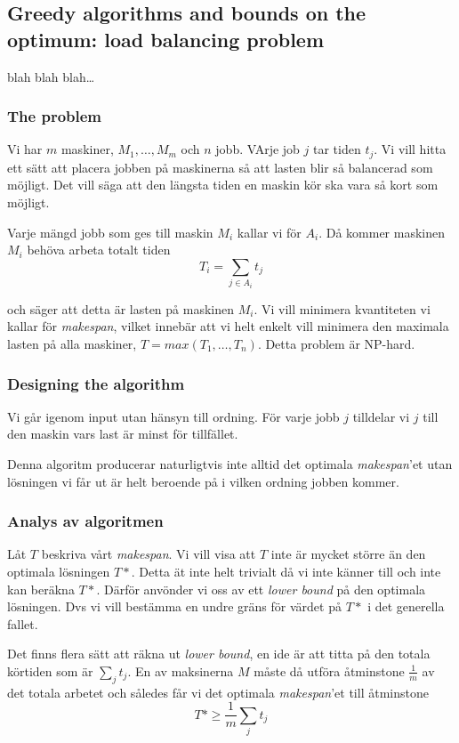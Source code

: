 \documentclass[a4paper]{report}
\begin{document}
\subsection{Greedy algorithms and bounds on the optimum: load balancing problem}
blah blah blah\ldots

\subsubsection{The problem}
Vi har $m$ maskiner, $M_1, \ldots, M_m$ och $n$ jobb. VArje job $j$ tar tiden
$t_j$. Vi vill hitta ett sätt att placera jobben på maskinerna så att lasten
blir så balancerad som möjligt. Det vill säga att den längsta tiden en maskin
kör ska vara så kort som möjligt.

Varje mängd jobb som ges till maskin $M_i$ kallar vi för $A_i$. Då kommer
maskinen $M_i$ behöva arbeta totalt tiden
\begin{equation}
	T_i = \sum_{j\in{}A_i} t_j
\end{equation}

och säger att detta är lasten på maskinen $M_i$. Vi vill minimera kvantiteten
vi kallar för \emph{makespan}, vilket innebär att vi helt enkelt vill minimera
den maximala lasten på alla maskiner, $T = max(T_1, \ldots, T_n)$. Detta problem är
NP-hard.

\subsubsection{Designing the algorithm}
Vi går igenom input utan hänsyn till ordning. För varje jobb $j$ tilldelar vi
$j$ till den maskin vars last är minst för tillfället.

Denna algoritm producerar naturligtvis inte alltid det optimala \emph{makespan}'et utan lösningen vi får ut är helt beroende på i vilken ordning jobben kommer.

\subsubsection{Analys av algoritmen}
Låt $T$ beskriva vårt \emph{makespan}. Vi vill visa att $T$ inte är mycket
större än den optimala lösningen $T*$. Detta ät inte helt trivialt då vi inte
känner till och inte kan beräkna $T*$. Därför anvönder vi oss av ett
\emph{lower bound} på den optimala lösningen. Dvs vi vill bestämma en undre
gräns för värdet på $T*$ i det generella fallet.

Det finns flera sätt att räkna ut \emph{lower bound}, en ide är att titta på
den totala körtiden som är $\sum_{j} t_j$. En av maksinerna $M$ måste då utföra
åtminstone $\frac{1}{m}$ av det totala arbetet och således får vi det optimala
\emph{makespan}'et till åtminstone
\begin{equation}
	T* \geq \frac{1}{m} \sum_j t_j
\end{equation}
\end{document}
